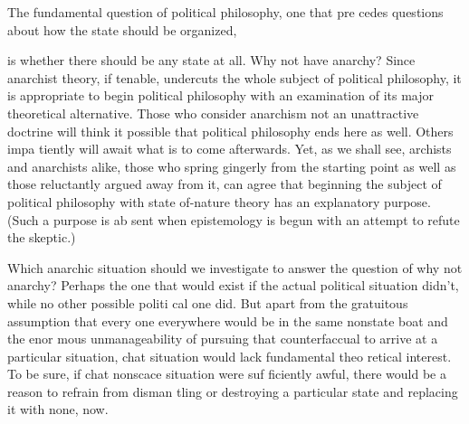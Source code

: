 \documentclass[11pt,openany]{book}
\begin{document}
The fundamental question of political philosophy, one that pre cedes questions about how the state should be organized, 

is whether there should be any state at all. Why not have anarchy? Since anarchist theory, if tenable, undercuts the whole subject of political philosophy, it is appropriate to begin political philosophy with an examination of its major theoretical alternative. Those who consider anarchism not an unattractive doctrine will think it possible that political philosophy ends here as well. Others impa tiently will await what is to come afterwards. Yet, as we shall see, archists and anarchists alike, those who spring gingerly from the starting point as well as those reluctantly argued away from it, can agree that beginning the subject of political philosophy with state of-nature theory has an explanatory purpose. (Such a purpose is ab sent when epistemology is begun with an attempt to refute the skeptic.) 

Which anarchic situation should we investigate to answer the question of why not anarchy? Perhaps the one that would exist if the actual political situation didn't, while no other possible politi cal one did. But apart from the gratuitous assumption that every one everywhere would be in the same nonstate boat and the enor mous unmanageability of pursuing that counterfaccual to arrive at a particular situation, chat situation would lack fundamental theo retical interest. To be sure, if chat nonscace situation were suf ficiently awful, there would be a reason to refrain from disman tling or destroying a particular state and replacing it with none, now. 
\end{document}
